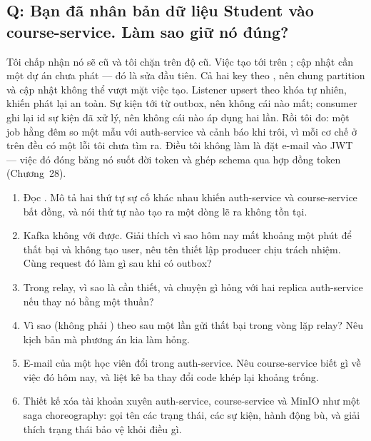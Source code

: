 \subsection*{Q: Bạn đã nhân bản dữ liệu Student vào course-service. Làm sao giữ nó đúng?}

Tôi chấp nhận nó sẽ cũ và tôi chặn trên độ cũ. Việc tạo tới trên
; cập nhật cần một  dự án
chưa phát --- đó là sửa đầu tiên. Cả hai key theo , nên
chung partition và cập nhật không thể vượt mặt việc tạo. Listener upsert
theo khóa tự nhiên, khiến phát lại an toàn. Sự kiện tới từ outbox, nên
không cái nào mất; consumer ghi lại id sự kiện đã xử lý, nên không cái
nào áp dụng hai lần. Rồi tôi đo: một job hằng đêm so một mẫu
 với auth-service và cảnh báo khi trôi, vì mỗi cơ
chế ở trên đều có một lỗi tôi chưa tìm ra. Điều tôi không làm là đặt
e-mail vào JWT --- việc đó đóng băng nó suốt đời token và ghép schema
qua hợp đồng token (Chương~28).

\begin{quiz}
\begin{enumerate}
  \item Đọc . Mô tả hai thứ tự sự cố khác
  nhau khiến auth-service và course-service bất đồng, và nói thứ tự nào
  tạo ra một dòng lẽ ra không tồn tại.
  \item Kafka không với được. Giải thích vì sao 
  hôm nay mất khoảng một phút để thất bại và không tạo user, nêu tên
  thiết lập producer chịu trách nhiệm. Cùng request đó làm gì sau khi
  có outbox?
  \item Trong relay, vì sao  là cần thiết,
  và chuyện gì hỏng với hai replica auth-service nếu thay nó bằng một
   thuần?
  \item Vì sao  (không phải ) theo sau một
  lần gửi thất bại trong vòng lặp relay? Nêu kịch bản mà phương án kia
  làm hỏng.
  \item E-mail của một học viên đổi trong auth-service. Nêu
  course-service biết gì về việc đó hôm nay, và liệt kê ba thay đổi
  code khép lại khoảng trống.
  \item Thiết kế xóa tài khoản xuyên auth-service, course-service và
  MinIO như một saga choreography: gọi tên các trạng thái, các sự kiện,
  hành động bù, và giải thích trạng thái  bảo vệ khỏi
  điều gì.
\end{enumerate}
\end{quiz}
